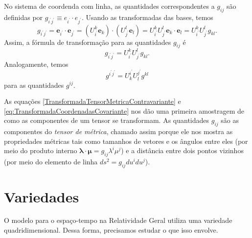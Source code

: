 No sistema de coordenda com linha, as quantidades correspondentes a $g_{ij}$ são definidas por $g_{i^{\prime} j^{\prime}} \equiv e_{i^{\prime}} \cdot e_{j^{\prime}}$. Usando as transformadas das bases, temos
\[
	g_{i^{\prime} j^{\prime}}=\mathbf{e}_{i^{\prime}} \cdot \mathbf{e}_{j^{\prime}}=\left(U_{i^{\prime}}^{k} \mathbf{e}_{k}\right) \cdot\left(U_{j^{\prime}}^{l} \mathbf{e}_{l}\right)=U_{i^{\prime}}^{k} U_{j^{\prime}}^{l} \mathbf{e}_{k} \cdot \mathbf{e}_{l}=U_{i^{\prime}}^{k} U_{j^{\prime}}^{l} g_{k l} .
\]
Assim, a fórmula de transformação para as quantidades $g_{ij}$ é
\begin{equation}\label{TransformadaTensorMetricaContravariante}
	\boxed{
		g_{i^{\prime} j^{\prime}}=U_{i^{\prime}}^{k} U_{j^{\prime}}^{l} g_{k l} .
	}
\end{equation}
Analogamente, temos
\begin{equation}\label{TransformadaTensorMetricaCovariante}
	\boxed{
		g^{i^{\prime} j^{\prime}}=U^{i^{\prime}}_{k} U^{j^{\prime}}_{l} g^{k l} 
	}
\end{equation}
para as quantidades $g^{ij}$.

As equações \eqref{TransformadaTensorMetricaContravariante} e \eqref{eq:TransformadaCoordenadasCovariante} nos dão uma primeira amostragem de como as componentes de um tensor se transformam. As quantidades $g_{ij}$ são as componentes do \textit{tensor de métrica}, chamado assim porque ele nos mostra as propriedades métricas tais como tamanhos de vetores e os ângulos entre eles (por meio do produto interno $\boldsymbol{\lambda}\cdot\boldsymbol{\mu}=g_{ij}\lambda^i\mu^j$) e a distância entre dois pontos vizinhos (por meio do elemento de linha $ds^2=g_{ij}du^idu^j$).








\section{Variedades}\label{sec:Variedades}

O modelo para o espaço-tempo na Relatividade Geral utiliza uma variedade quadridimensional. Dessa forma, precisamos estudar o que isso envolve.

